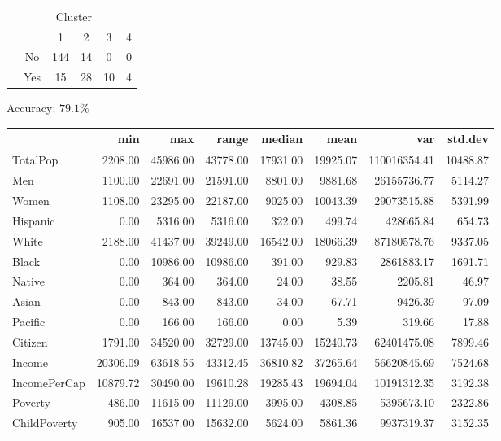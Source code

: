 \documentclass{article}
\begin{document}
\begin{table}
	\centering
	\begin{tabular}{lc|cccc}
		\multicolumn{4}{r}{Cluster}\\
		&&1&2&3&4\\\cline{2-6}
		\multirow{2}{*}{\STAB{\rotatebox[origin=c]{90}{UW}}}
		&No&144&14&0&0\\
		&Yes&15&28&10&4\\
	\end{tabular}
\end{table}

Accuracy: $79.1\%$

\begin{table}
	\centering
	\begin{tabular}{l|rrrrrrr}
		& min & max & range & median & mean & var & std.dev\\\hline
		TotalPop & 2208.00 & 45986.00 & 43778.00 & 17931.00 & 19925.07 & 110016354.41 & 10488.87\\
		Men & 1100.00 & 22691.00 & 21591.00 & 8801.00 & 9881.68 & 26155736.77 & 5114.27\\
		Women & 1108.00 & 23295.00 & 22187.00 & 9025.00 & 10043.39 & 29073515.88 & 5391.99\\
		Hispanic & 0.00 & 5316.00 & 5316.00 & 322.00 & 499.74 & 428665.84 & 654.73\\
		White & 2188.00 & 41437.00 & 39249.00 & 16542.00 & 18066.39 & 87180578.76 & 9337.05\\
		Black & 0.00 & 10986.00 & 10986.00 & 391.00 & 929.83 & 2861883.17 & 1691.71\\
		Native & 0.00 & 364.00 & 364.00 & 24.00 & 38.55 & 2205.81 & 46.97\\
		Asian & 0.00 & 843.00 & 843.00 & 34.00 & 67.71 & 9426.39 & 97.09\\
		Pacific & 0.00 & 166.00 & 166.00 & 0.00 & 5.39 & 319.66 & 17.88\\
		Citizen & 1791.00 & 34520.00 & 32729.00 & 13745.00 & 15240.73 & 62401475.08 & 7899.46\\
		Income & 20306.09 & 63618.55 & 43312.45 & 36810.82 & 37265.64 & 56620845.69 & 7524.68\\
		IncomePerCap & 10879.72 & 30490.00 & 19610.28 & 19285.43 & 19694.04 & 10191312.35 & 3192.38\\
		Poverty & 486.00 & 11615.00 & 11129.00 & 3995.00 & 4308.85 & 5395673.10 & 2322.86\\
		ChildPoverty & 905.00 & 16537.00 & 15632.00 & 5624.00 & 5861.36 & 9937319.37 & 3152.35\\

\end{tabular}
\end{table}
\end{document}
